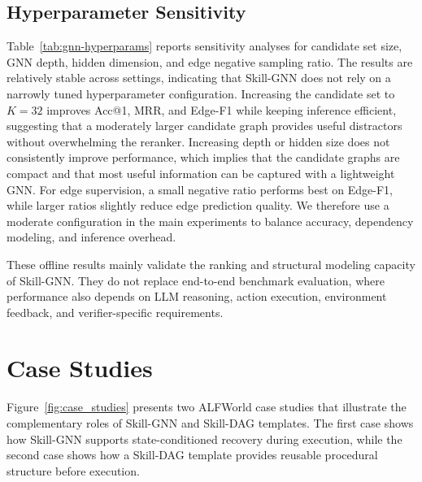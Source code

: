 \documentclass[letterpaper]{article}
\begin{document}
\subsection{Hyperparameter Sensitivity}
\label{app:gnn_hyperparams}

Table~\ref{tab:gnn-hyperparams} reports sensitivity analyses for candidate set
size, GNN depth, hidden dimension, and edge negative sampling ratio. The results
are relatively stable across settings, indicating that Skill-GNN does not rely
on a narrowly tuned hyperparameter configuration. Increasing the candidate set
to $K=32$ improves Acc@1, MRR, and Edge-F1 while keeping inference efficient,
suggesting that a moderately larger candidate graph provides useful distractors
without overwhelming the reranker. Increasing depth or hidden size does not
consistently improve performance, which implies that the candidate graphs are
compact and that most useful information can be captured with a lightweight
GNN. For edge supervision, a small negative ratio performs best on Edge-F1,
while larger ratios slightly reduce edge prediction quality. We therefore use a
moderate configuration in the main experiments to balance accuracy, dependency
modeling, and inference overhead.

These offline results mainly validate the ranking and structural modeling
capacity of Skill-GNN. They do not replace end-to-end benchmark evaluation,
where performance also depends on LLM reasoning, action execution, environment
feedback, and verifier-specific requirements.



\section{Case Studies}
\label{app:case_studies}
Figure~\ref{fig:case_studies} presents two ALFWorld case studies that illustrate
the complementary roles of Skill-GNN and Skill-DAG templates. The first case
shows how Skill-GNN supports state-conditioned recovery during execution, while
the second case shows how a Skill-DAG template provides reusable procedural
structure before execution.
\end{document}
